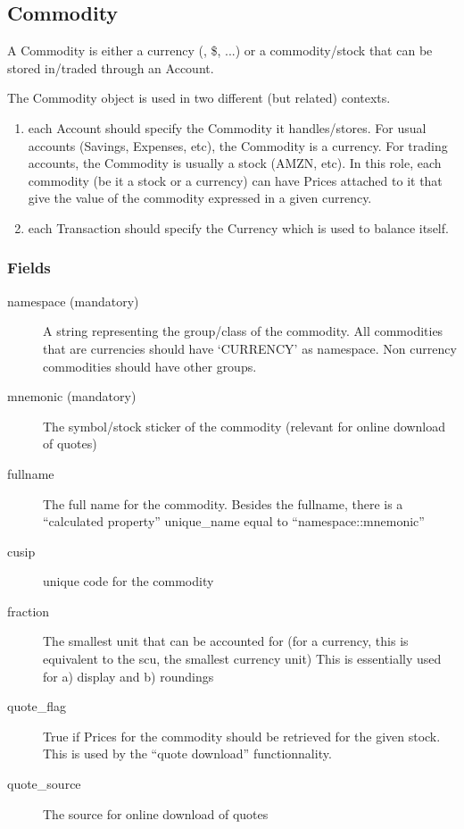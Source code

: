 \documentclass[letterpaper,10pt,english]{sphinxmanual}
\begin{document}
\subsection{Commodity}
\label{object_model:commodity}
A Commodity is either a currency (\texteuro{}, \$, ...) or a commodity/stock that can be stored in/traded through an Account.

The Commodity object is used in two different (but related) contexts.
\begin{enumerate}
\item {} 
each Account should specify the Commodity it handles/stores. For usual accounts (Savings, Expenses, etc), the Commodity
is a currency. For trading accounts, the Commodity is usually a stock (AMZN, etc).
In this role, each commodity (be it a stock or a currency) can have Prices attached to it that give the value of the
commodity expressed in a given currency.

\item {} 
each Transaction should specify the Currency which is used to balance itself.

\end{enumerate}


\subsubsection{Fields}
\label{object_model:id1}\begin{description}
\item[{namespace (mandatory)}] \leavevmode
A string representing the group/class of the commodity. All commodities that are currencies should have `CURRENCY' as
namespace. Non currency commodities should have other groups.

\item[{mnemonic (mandatory)}] \leavevmode
The symbol/stock sticker of the commodity (relevant for online download of quotes)

\item[{fullname}] \leavevmode
The full name for the commodity. Besides the fullname, there is a ``calculated property'' unique\_name equal to ``namespace::mnemonic''

\item[{cusip}] \leavevmode
unique code for the commodity

\item[{fraction}] \leavevmode
The smallest unit that can be accounted for (for a currency, this is equivalent to the scu, the smallest currency unit)
This is essentially used for a) display and b) roundings

\item[{quote\_flag}] \leavevmode
True if Prices for the commodity should be retrieved for the given stock. This is used by the ``quote download'' functionnality.

\item[{quote\_source}] \leavevmode
The source for online download of quotes

\end{description}
\end{document}
